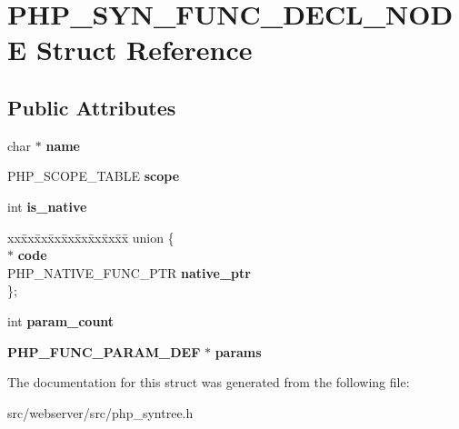 \section{PHP\_\-SYN\_\-FUNC\_\-DECL\_\-NODE Struct Reference}
\label{structPHP__SYN__FUNC__DECL__NODE}
\subsection*{Public Attributes}
\begin{DoxyCompactItemize}
\item 
char $\ast$ {\bfseries name}\label{structPHP__SYN__FUNC__DECL__NODE_a980e2f966b4a6505eab5c8b0c7fca52c}

\item 
PHP\_\-SCOPE\_\-TABLE {\bfseries scope}\label{structPHP__SYN__FUNC__DECL__NODE_a5b3c7ad991d9226767c8200403dbc909}

\item 
int {\bfseries is\_\-native}\label{structPHP__SYN__FUNC__DECL__NODE_abef8bfdef50af0a23f332bd363291a66}

\item 
\begin{tabbing}
xx\=xx\=xx\=xx\=xx\=xx\=xx\=xx\=xx\=\kill
union \{\\
 $\ast$ {\bfseries code}\\
\>PHP\_NATIVE\_FUNC\_PTR {\bfseries native\_ptr}\\
\}; \label{structPHP__SYN__FUNC__DECL__NODE_aa91bb997cd8d464d5fe6c782feece94d}
\\

\end{tabbing}\item 
int {\bfseries param\_\-count}\label{structPHP__SYN__FUNC__DECL__NODE_af879edfe16f87c7ddeb3e80f70187f2f}

\item 
{\bf PHP\_\-FUNC\_\-PARAM\_\-DEF} $\ast$ {\bfseries params}\label{structPHP__SYN__FUNC__DECL__NODE_a299fda62a6fc0b51340b8afa5f9bea1e}

\end{DoxyCompactItemize}


The documentation for this struct was generated from the following file:\begin{DoxyCompactItemize}
\item 
src/webserver/src/php\_\-syntree.h\end{DoxyCompactItemize}
